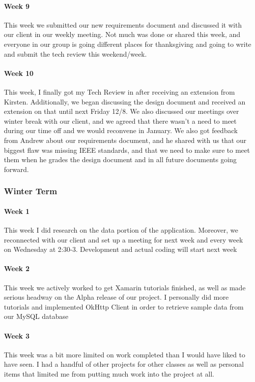 \documentclass{article}
\begin{document}
\paragraph{Week 9}
This week we submitted our new requirements document and discussed it with our client in our weekly meeting. Not much was done or shared this week, and everyone in our group is going different places for thanksgiving and going to write and submit the tech review this weekend/week. 
\paragraph{Week 10}
This week, I finally got my Tech Review in after receiving an extension from Kirsten. Additionally, we began discussing the design document and received an extension on that until next Friday 12/8. We also discussed our meetings over winter break with our client, and we agreed that there wasn't a need to meet during our time off and we would reconvene in January. We also got feedback from Andrew about our requirements document, and he shared with us that our biggest flaw was missing IEEE standards, and that we need to make sure to meet them when he grades the design document and in all future documents going forward. 

\subsubsection{Winter Term}
\paragraph{Week 1}
This week I did research on the data portion of the application. Moreover, we reconnected with our client and set up a meeting for next week and every week on Wednesday at 2:30-3. Development and actual coding will start next week
\paragraph{Week 2}
This week we actively worked to get Xamarin tutorials finished, as well as made serious headway on the Alpha release of our project.  I personally did more tutorials and implemented OkHttp Client in order to retrieve sample data from our MySQL database
\paragraph{Week 3}
This week was a bit more limited on work completed than I would have liked to have seen. I had a handful of other projects for other classes as well as personal items that limited me from putting much work into the project at all.
\end{document}
